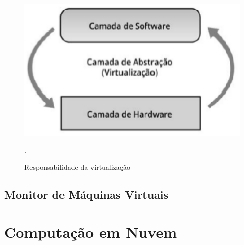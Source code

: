 \begin{figure}[!htb]
\centering
\includegraphics [keepaspectratio=true,scale=0.60]{figuras/virtualization_role.eps}
\caption{Responsabilidade da virtualização}
\cite{manoel}.
\label{virtualization_role}
\end{figure}

\subsection{Monitor de Máquinas Virtuais}



\section{Computação em Nuvem}